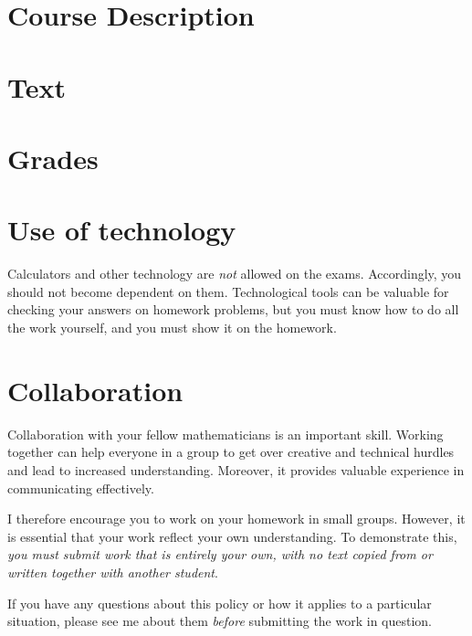\documentclass[11pt,article]{memoir}
\begin{document}
\maketitle

\section*{Course Description}

\section*{Text}

\section*{Grades}

\section*{Use of technology}
Calculators and other technology are \emph{not} allowed on the exams.
Accordingly, you should not become dependent on them.
Technological tools can be valuable for checking your answers on homework problems, but you must know how to do all the work yourself, and you must show it on the homework.

\section*{Collaboration}
Collaboration with your fellow mathematicians is an important skill.
Working together can help everyone in a group to get over creative and technical hurdles and lead to increased understanding.
Moreover, it provides valuable experience in communicating effectively.

I therefore encourage you to work on your homework in small groups.
However, it is essential that your work reflect your own understanding.
To demonstrate this, \emph{you must submit work that is entirely your own, with no text copied from or written together with another student}.

If you have any questions about this policy or how it applies to a particular situation, please see me about them \emph{before} submitting the work in question.
\end{document}
